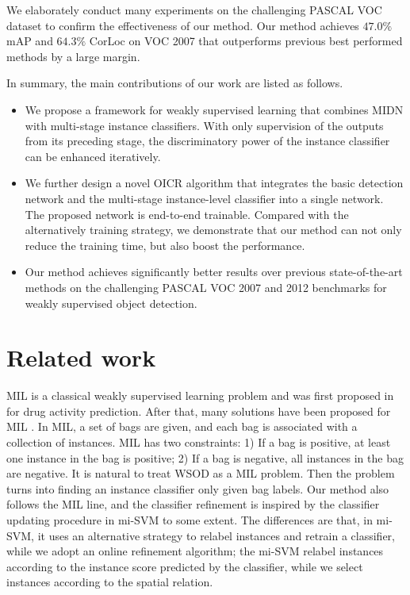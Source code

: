 \documentclass[10pt,twocolumn,letterpaper]{article}
\begin{document}
We elaborately conduct many experiments on the challenging PASCAL VOC dataset to confirm the effectiveness of our method.
Our method achieves $47.0\%$ mAP and $64.3\%$ CorLoc on VOC 2007 that outperforms previous best performed methods by a large margin.

In summary, the main contributions of our work are listed as follows.
\begin{itemize}
   \item We propose a framework for weakly supervised learning that combines MIDN with multi-stage instance classifiers.
   With only supervision of the outputs from its preceding stage, the discriminatory power of the instance classifier can be enhanced iteratively.
   \item We further design a novel OICR algorithm that integrates the basic detection network and the multi-stage instance-level classifier into a single network.
   The proposed network is end-to-end trainable.
   Compared with the alternatively training strategy, we demonstrate that our method can not only reduce the training time, but also boost the performance.
   \item Our method achieves significantly better results over previous state-of-the-art methods on the challenging PASCAL VOC 2007 and 2012 benchmarks for weakly supervised object detection.
\end{itemize}



\section{Related work}
\label{sec:related_work}


MIL is a classical weakly supervised learning problem and was first proposed in \cite{Ref:Dietterich1997} for drug activity prediction.
After that, many solutions have been proposed for MIL \cite{Ref:Andrews2002,Ref:Wang2015,Ref:Zhang2001}.
In MIL, a set of bags are given, and each bag is associated with a collection of instances.
MIL has two constraints:
1) If a bag is positive, at least one instance in the bag is positive;
2) If a bag is negative, all instances in the bag are negative.
It is natural to treat WSOD as a MIL problem.
Then the problem turns into finding an instance classifier only given bag labels.
Our method also follows the MIL line, and the classifier refinement is inspired by the classifier updating procedure in mi-SVM \cite{Ref:Andrews2002} to some extent.
The differences are that, in mi-SVM, it uses an alternative strategy to relabel instances and retrain a classifier, while we adopt an online refinement algorithm; the mi-SVM relabel instances according to the instance score predicted by the classifier, while we select instances according to the spatial relation.
\end{document}
